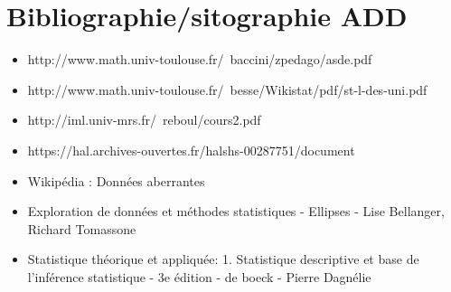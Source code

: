 	\section{Bibliographie/sitographie ADD}
	\begin{itemize}
		\item http://www.math.univ-toulouse.fr/~baccini/zpedago/asde.pdf
		\item http://www.math.univ-toulouse.fr/~besse/Wikistat/pdf/st-l-des-uni.pdf
		\item http://iml.univ-mrs.fr/~reboul/cours2.pdf
		\item https://hal.archives-ouvertes.fr/halshs-00287751/document
		\item Wikipédia : Données aberrantes
		\item Exploration de données et méthodes statistiques - Ellipses - Lise Bellanger, Richard Tomassone
		\item Statistique théorique et appliquée: 1. Statistique descriptive et base de l'inférence statistique - 3e édition - de boeck - Pierre Dagnélie
	\end{itemize}

